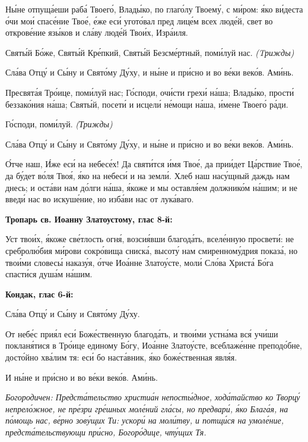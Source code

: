    Ны́не отпуща́еши раба́ Твоего́, Влады́ко, по глаго́лу Твоему́, с
ми́ром: я́ко ви́деста о́чи мои́ спасе́ние Твое́, е́же еси́ угото́вал пред
лице́м всех люде́й, свет во открове́ние язы́ков и сла́ву люде́й Твои́х,
Изра́иля.


   Святы́й Бо́же, Святы́й Кре́пкий, Святы́й Безсме́ртный, поми́луй нас.
\itshape (Tрижды)\normalfont{}


   Сла́ва Отцу́ и Сы́ну и Свято́му Ду́ху, и ны́не и при́сно и во ве́ки веко́в.
Ами́нь.


   Пресвята́я Тро́ице, поми́луй нас; Го́споди, очи́сти грехи́ на́ша; Влады́ко,
прости́ беззако́ния на́ша; Святы́й, посети́ и исцели́ не́мощи на́ша, и́мене
Твоего́ ра́ди.


   Го́споди, поми́луй. \itshape (Трижды)\normalfont{}


   Сла́ва Отцу́ и Сы́ну и Свято́му Ду́ху, и ны́не и при́сно и во ве́ки веко́в.
Ами́нь.


   О́тче наш, И́же еси́ на небесе́х! Да святи́тся и́мя Твое́, да прии́дет
Ца́рствие Твое́, да бу́дет во́ля Твоя́, я́ко на небеси́ и на земли́. Хлеб наш
насу́щный даждь нам днесь; и оста́ви нам до́лги на́ша, я́коже и мы оставля́ем
должнико́м на́шим; и не введи́ нас во искуше́ние, но изба́ви нас от
лука́ваго.



 

\bfseries Тропарь св. Иоанну Златоустому, глас 8-й:\normalfont{}


   Уст твои́х, я́коже све́тлость огня́, возсия́вши благода́ть, вселе́нную
просвети́: не сребролю́бия ми́рови сокро́вища сниска́, высоту́ нам
смиренному́дрия показа́, но твои́ми словесы́ наказу́я, о́тче Иоа́нне Златоу́сте,
моли́ Сло́ва Христа́ Бо́га спасти́ся душа́м на́шим.



 

\bfseries Кондак, глас 6-й:\normalfont{}


   Сла́ва Отцу́ и Сы́ну и Свято́му Ду́ху.


   От небе́с прия́л еси́ Боже́ственную благода́ть, и твои́ми устна́ма вся́
учи́ши покланя́тися в Тро́ице единому Бо́гу, Иоа́нне Златоу́сте, всеблаже́нне
преподо́бне, досто́йно хва́лим тя: еси́ бо наста́вник, я́ко боже́ственная
явля́я.


   И ны́не и при́сно и во ве́ки веко́в. Ами́нь.


 \itshape Богородичен:\normalfont{} Предста́тельство христиа́н непосты́дное, хода́тайство ко
Творцу́ непрело́жное, не пре́зри гре́шных моле́ний гла́сы, но предвари́, я́ко
Блага́я, на по́мощь нас, ве́рно зову́щих Ти: ускори́ на моли́тву, и
потщи́ся на умоле́ние, предста́тельствующи при́сно, Богоро́дице, чту́щих
Тя.



